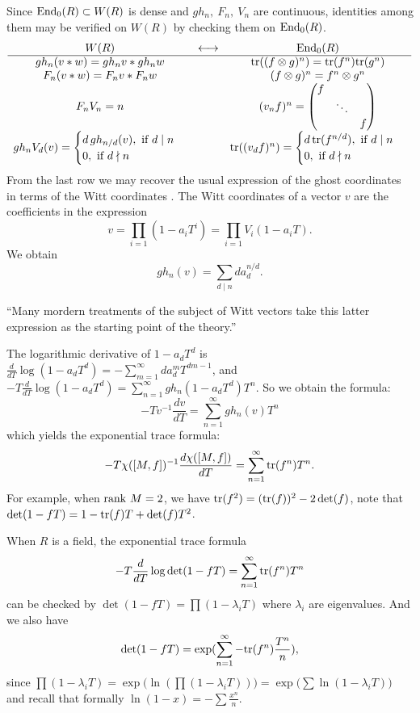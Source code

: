 Since $\mathrm{End}_0(R) \subset W(R)$ is dense and $gh_n,\ F_n,\ V_n$ are continuous, identities among them may be verified on $W(R)$ by checking them on $\mathrm{End}_0(R)$.  
\begin{equation*}
	\begin{array}{ccc}
	W(R) &\longleftrightarrow &\mathrm{End}_0(R)\\
	\hline
	 gh_n(v*w)=gh_n v*gh_n w  & & \mathrm{tr}((f\otimes g)^n)=\mathrm{tr}(f^n)\mathrm{tr}(g^n)\\
	 F_n(v*w)=F_n v*F_n w & &  (f\otimes g)^n=f^n\otimes g^n  \\	
	F_nV_n=n &  & (v_nf)^n=\begin{pmatrix}
 f & & \\ &\ddots & \\ & & f		
	\end{pmatrix} \\
	gh_nV_d(v)=\begin{cases}
		d\,gh_{n/d}(v), \mbox{ if }d\mid n \\0, \mbox{ if } d\nmid n
	\end{cases} & & \mathrm{tr}((v_d f)^n)=\begin{cases}
		d\,\mathrm{tr}(f^{n/d}), \mbox{ if }d\mid n \\0, \mbox{ if } d\nmid n
	\end{cases}
\end{array}
\end{equation*}
From the last row we may recover the usual expression of the ghost coordinates in terms of the Witt coordinates . The Witt coordinates of a vector $v$ are the coefficients in the expression
\[v=\prod_{i=1}(1-a_iT^i)=\prod_{i=1}V_i(1-a_i T). \]
We obtain
\[gh_n(v)=\sum_{d\mid n}da_d^{n/d}. \]

``Many mordern treatments of the subject of Witt vectors take this latter expression as the starting point of the theory.''

The logarithmic derivative of $1-a_dT^d$ is $\frac{d}{dT}\log (1-a_dT^d)=-\sum_{m=1}^\infty da_d^mT^{dm-1}$, and $-T\frac{d}{dT}\log (1-a_dT^d)=\sum_{n=1}^\infty gh_n(1-a_dT^d) T^n$. So we obtain the formula:
\[-Tv^{-1}\frac{dv}{dT}=\sum_{n=1}^\infty gh_n(v)T^n\]
which yields the exponential trace formula:
\[-T\chi([M,f])^{-1}\frac{d\chi([M,f])}{dT}=\sum_{n=1}^\infty \mathrm{tr}(f^n)T^n.\]
For example, when $\mathrm{rank\ } M =2$, we have $\mathrm{tr}(f^2)=(\mathrm{tr}(f))^2-2\det(f)$, note that $\det(1-fT)=1-\mathrm{tr}(f)T+\det(f)T^2$.

\begin{remark}
	When $R$ is a field, the exponential trace formula 
	\[-T\frac{d}{dT}\log \det(1-fT)=\sum_{n=1}^\infty \mathrm{tr}(f^n)T^n\]
	can be checked by $\det(1-fT)=\prod (1-\lambda_i T)$ where $\lambda_i$ are eigenvalues. And we also have
	\[\det(1-fT)=\exp(\sum_{n=1}^\infty -\mathrm{tr}(f^n)\frac{T^n}{n}),\]
	since $\prod (1-\lambda_i T)=\exp \big(\ln(\prod (1-\lambda_i T))\big)=\exp\big(\sum \ln (1-\lambda_i T)\big)$ and recall that formally $\ln(1-x) = -\sum \frac{x^n}{n}$.
\end{remark}



